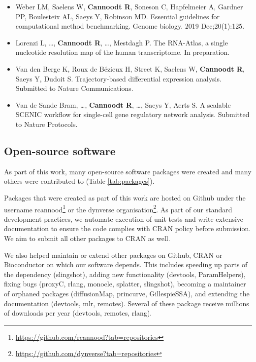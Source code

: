 \begin{itemize}
	\item Weber LM, Saelens W, \textbf{Cannoodt R}, Soneson C, Hapfelmeier A, Gardner PP, Boulesteix AL, Saeys Y, Robinson MD. Essential guidelines for computational method benchmarking. Genome biology. 2019 Dec;20(1):125.
	\item Lorenzi L, \ldots, \textbf{Cannoodt R}, \ldots, Mestdagh P. The RNA-Atlas, a single nucleotide resolution map of the human transcriptome. In preparation.
	\item Van den Berge K, Roux de Bézieux H, Street K, Saelens W, \textbf{Cannoodt R}, Saeys Y, Dudoit S. Trajectory-based differential expression analysis. Submitted to Nature Communications.
	\item Van de Sande Bram, \ldots, \textbf{Cannoodt R}, \ldots, Saeys Y, Aerts S. A scalable SCENIC workflow for single-cell gene regulatory network analysis. Submitted to Nature Protocols.
\end{itemize}

\subsection{Open-source software}
As part of this work, many open-source software packages were created and many others were contributed to (Table \ref{tab:packages}). 

Packages that were created as part of this work are hosted on Github under the username rcannood\footnote{\url{https://github.com/rcannood?tab=repositories}} or the dynverse organisation\footnote{\url{https://github.com/dynverse?tab=repositories}}. As part of our standard development practices, we automate execution of unit tests and write extensive documentation to ensure the code complies with CRAN policy before submission. We aim to submit all other packages to CRAN as well.

We also helped maintain or extend other packages on Github, CRAN or Bioconductor on which our software depends. This includes speeding up parts of the dependency (slingshot), adding new functionality (devtools, ParamHelpers), fixing bugs (proxyC, rlang, monocle, splatter, slingshot), becoming a maintainer of orphaned packages (diffusionMap, princurve, GillespieSSA), and extending the documentation (devtools, mlr, remotes). Several of these package receive millions of downloads per year (devtools, remotes, rlang).

\newcommand{\cranpkg}[1]{\href{https://cran.r-project.org/package=#1}{#1}}
\newcommand{\biocpkg}[1]{\href{https://bioconductor.org/packages/#1}{#1}}
\newcommand{\biocpkgl}[2]{\href{https://bioconductor.org/packages/#1}{#2}}
\newcommand{\githubpkg}[2]{\href{https://github.com/#1/#2}{#2}}
\newcommand{\notavailable}{}

